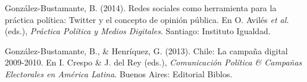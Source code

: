 \begin{publications}
\begin{benumerate}{13}
\item{\small Gonz\'alez-Bustamante, B. (2014). Redes sociales como herramienta para la pr\'actica pol\'itica: Twitter y el concepto de opini\'on p\'ublica. En O. Avil\'es {\itshape et al.} (eds.), {\itshape Pr\'actica Pol\'itica y Medios Digitales}. Santiago: Instituto Igualdad.} \vspace{1mm}

\item{\small Gonz\'alez-Bustamante, B., \& Henr\'iquez, G. (2013). Chile: La campaña digital 2009-2010. En I. Crespo \& J. del Rey (eds.), {\itshape Comunicaci\'on Pol\'itica \& Campa\~nas Electorales en Am\'erica Latina}. Buenos Aires: Editorial Biblos.} \vspace{1mm}
\end{benumerate}

\end{publications}
